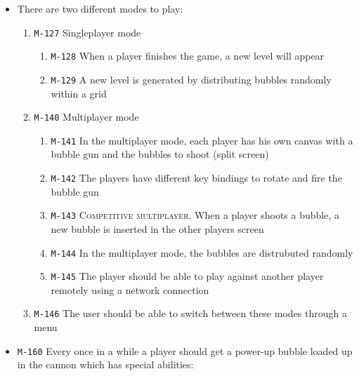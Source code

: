 \documentclass[a4paper]{article}
\begin{document}
\begin{itemize}
  \item There are two different modes to play:
  \begin{enumerate}
  
      \item \texttt{M-127} Singleplayer mode
      \begin{enumerate}
          \item \texttt{M-128} When a player finishes the game, a new level will appear
          \item \texttt{M-129} A new level is generated by distributing bubbles randomly within a grid
      \end{enumerate}


      \item \texttt{M-140} Multiplayer mode
      \begin{enumerate}
          \item \texttt{M-141} In the multiplayer mode, each player has his own canvas with a bubble gun and the bubbles to shoot (split screen)
          \item \texttt{M-142} The players have different key bindings to rotate and fire the bubble gun
          \item \texttt{M-143} \textsc{Competitive multiplayer.} When a player shoots a bubble, a new bubble is inserted in the other players screen
          \item \texttt{M-144} In the multiplayer mode, the bubbles are distrubuted randomly
          \item \texttt{M-145} The player should be able to play against another player remotely using a network connection
      \end{enumerate}
      
      \item \texttt{M-146} The user should be able to switch between these modes through a menu
  \end{enumerate}
  
  
  \item \texttt{M-160} Every once in a while a player should get a power-up bubble loaded up in the cannon which has special abilities:
  

\end{itemize}
\end{document}
